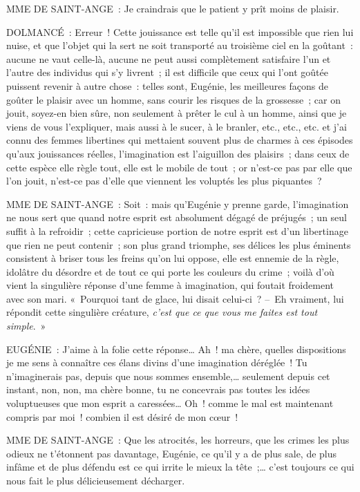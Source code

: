 \documentclass[french,twoside]{book} %
\begin{document}
MME DE SAINT-ANGE : Je craindrais que le patient y prît moins de plaisir.\par
DOLMANCÉ : Erreur ! Cette jouissance est telle qu’il est impossible que rien lui nuise, et que l’objet qui la sert ne soit transporté au troisième ciel en la goûtant : aucune ne vaut celle-là, aucune ne peut aussi complètement satisfaire l’un et l’autre des individus qui s’y livrent ; il est difficile que ceux qui l’ont goûtée puissent revenir à autre chose : telles sont, Eugénie, les meilleures façons de goûter le plaisir avec un homme, sans courir les risques de la grossesse ; car on jouit, soyez-en bien sûre, non seulement à prêter le cul à un homme, ainsi que je viens de vous l’expliquer, mais aussi à le sucer, à le branler, etc., etc., etc. et j’ai connu des femmes libertines qui mettaient souvent plus de charmes à ces épisodes qu’aux jouissances réelles, l’imagination est l’aiguillon des plaisirs ; dans ceux de cette espèce elle règle tout, elle est le mobile de tout ; or n’est-ce pas par elle que l’on jouit, n’est-ce pas d’elle que viennent les voluptés les plus piquantes ?\par
MME DE SAINT-ANGE : Soit : mais qu’Eugénie y prenne garde, l’imagination ne nous sert que quand notre esprit est absolument dégagé de préjugés ; un seul suffit à la refroidir ; cette capricieuse portion de notre esprit est d’un libertinage que rien ne peut contenir ; son plus grand triomphe, ses délices les plus éminents consistent à briser tous les freins qu’on lui oppose, elle est ennemie de la règle, idolâtre du désordre et de tout ce qui porte les couleurs du crime ; voilà d’où vient la singulière réponse d’une femme à imagination, qui foutait froidement avec son mari. « Pourquoi tant de glace, lui disait celui-ci ? – Eh vraiment, lui répondit cette singulière créature, {\itshape c’est que ce que vous me faites est tout simple}. »\par
EUGÉNIE : J’aime à la folie cette réponse… Ah ! ma chère, quelles dispositions je me sens à connaître ces élans divins d’une imagination déréglée ! Tu n’imaginerais pas, depuis que nous sommes ensemble,… seulement depuis cet instant, non, non, ma chère bonne, tu ne concevrais pas toutes les idées voluptueuses que mon esprit a caressées… Oh ! comme le mal est maintenant compris par moi ! combien il est désiré de mon cœur !\par
MME DE SAINT-ANGE : Que les atrocités, les horreurs, que les crimes les plus odieux ne t’étonnent pas davantage, Eugénie, ce qu’il y a de plus sale, de plus infâme et de plus défendu est ce qui irrite le mieux la tête ;… c’est toujours ce qui nous fait le plus délicieusement décharger.\par
\end{document}
